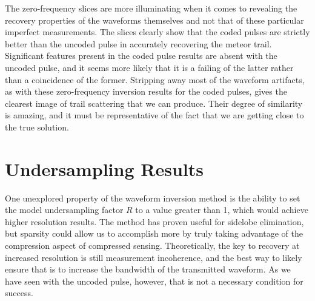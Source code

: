 The zero-frequency slices are more illuminating when it comes to revealing the recovery properties of the waveforms themselves and not that of these particular imperfect measurements. The slices clearly show that the coded pulses are strictly better than the uncoded pulse in accurately recovering the meteor trail. Significant features present in the coded pulse results are absent with the uncoded pulse, and it seems more likely that it is a failing of the latter rather than a coincidence of the former. Stripping away most of the waveform artifacts, as with these zero-frequency inversion results for the coded pulses, gives the clearest image of trail scattering that we can produce. Their degree of similarity is amazing, and it must be representative of the fact that we are getting close to the true solution.

\section{Undersampling Results}
One unexplored property of the waveform inversion method is the ability to set the model undersampling factor $R$ to a value greater than 1, which would achieve higher resolution results. The method has proven useful for sidelobe elimination, but sparsity could allow us to accomplish more by truly taking advantage of the compression aspect of compressed sensing. Theoretically, the key to recovery at increased resolution is still measurement incoherence, and the best way to likely ensure that is to increase the bandwidth of the transmitted waveform. As we have seen with the uncoded pulse, however, that is not a necessary condition for success.

